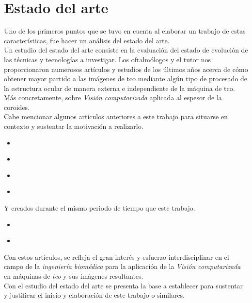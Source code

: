 \chapter{Estado del arte}\label{ch:estado_arte}
Uno de los primeros puntos que se tuvo en cuenta al elaborar un
trabajo de estas características, fue hacer un análisis del estado del
arte.\\
Un estudio del estado del arte consiste en la evaluación del estado de
evolución de las técnicas y tecnologías a investigar. Los oftalmólogos
y el tutor nos proporcionaron numerosos artículos y estudios de los
últimos años acerca de cómo obtener mayor partido a las imágenes de
\gls{tco} mediante algún tipo de procesado de la estructura ocular de
manera externa e independiente de la máquina de \gls{tco}. Más
concretamente, sobre \emph{Visión computarizada} aplicada al espesor
de la \gls{coroides}.\\
Cabe mencionar algunos artículos anteriores a este trabajo para
situarse en contexto y sustentar la motivación a realizarlo.
\begin{itemize}
\item \emph{\citep*[Automated choroidal segmentation of 1060 nm OCT in
    healthy and pathologic eyes using a statistical
    model]{kajic2012automated}}
\item \emph{\citep*[Automatic segmentation of the choroid in enhanced
    depth imaging optical coherence tomography
    images]{tian2013automatic}}
\item \emph{\citep*[Automatic segmentation of choroidal thickness in
    optical coherence tomography]{alonso2013automatic}}
\item \emph{\citep*[Segmentation of choroidal boundary in enhanced
    depth imaging OCTs using a multiresolution texture based modeling
    in graph cuts]{danesh2014segmentation}}
\end{itemize}
Y creados durante el mismo periodo de tiempo que este trabajo.
\begin{itemize}
\item \emph{\citep*[Evaluation of choroidal thickness via enhanced
    depth-imaging optical coherence tomography in patients with
    systemic hypertension]{gok2015evaluation}}
\item \emph{\citep*[Optical modelling of the human
    retina]{ara2015optical}}
\end{itemize}
Con estos artículos, se refleja el gran interés y esfuerzo
interdisciplinar en el campo de la \emph{ingeniería biomédica} para la
aplicación de la \emph{Visión computarizada} en máquinas de
\emph{\gls{tco}} y sus imágenes resultantes.\\
Con el estudio del estado del arte se presenta la base a establecer
para sustentar y justificar el inicio y elaboración de este trabajo o
similares.

